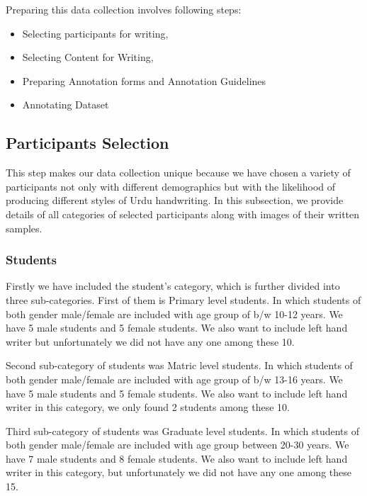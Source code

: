 \documentclass[a4paper,conference]{IEEEtran}
\begin{document}
Preparing this data collection involves following steps:
\begin{itemize}
\item Selecting participants for writing,
\item Selecting Content for Writing,
\item Preparing Annotation forms and Annotation Guidelines
\item Annotating Dataset

\end{itemize}

\subsection{Participants Selection}

This step makes our data collection unique because we have chosen a variety of participants not only with different demographics but with the likelihood of producing different styles of Urdu handwriting. In this subsection, we provide details of all categories of selected participants along with images of their written samples. 
\subsubsection{Students}
Firstly we have included the student’s category, which is further divided into three sub-categories.
First of them is Primary level students. In which students of both gender male/female are included with age group of b/w 10-12 years. We have 5 male students and 5 female students. We also want to include left hand writer but unfortunately we did not have any one among these 10.


Second sub-category of students was Matric level students. In which students of both gender male/female are included with age group of b/w 13-16 years. We have 5 male students and 5 female students. We also want to include left hand writer in this category, we only found 2 students among these 10.

Third sub-category of students was Graduate level students. In which students of both gender male/female are included with age group between 20-30 years. We have 7 male students and 8 female students. We also want to include left hand writer in this category, but unfortunately we did not have any one among these 15.
\end{document}

